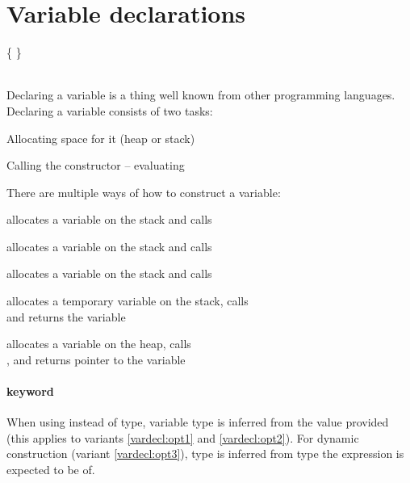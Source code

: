 \section{Variable declarations} \label{varDecls}
\begin{grammar}
	 \{  \}   \\
		\grLn [ ( \kwd{=} | \kwd{:=} ) \gr{Expression} ] \kwd{;} \\
	 
\end{grammar}

Declaring a variable is a thing well known from other programming languages. Declaring a variable consists of two tasks:
\begin{compactenum}
	\item Allocating space for it (heap or stack)
	\item Calling the constructor -- evaluating 
\end{compactenum}

There are multiple ways of how to construct a variable:
\begin{compactenum}
	\item {} \quad allocates a variable on the stack and calls 
	\item \label{vardecl:opt1}  allocates a variable on the stack and calls 
	\item \label{vardecl:opt2}  allocates a variable on the stack and calls\\ %
	\item {} allocates a temporary variable on the stack, calls\\ and returns the variable
	\item \label{vardecl:opt3}  allocates a variable on the heap, calls\\, and returns pointer to the variable
\end{compactenum}

\paragraph{ keyword}
When using  instead of type, variable type is inferred from the value provided (this applies to variants \ref{vardecl:opt1} and \ref{vardecl:opt2}). For dynamic construction (variant \ref{vardecl:opt3}), type is inferred from type the expression is expected to be of.

